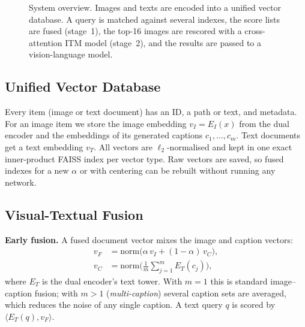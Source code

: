 \documentclass[conference]{IEEEtran}
\begin{document}
\begin{figure}[t]
\caption{System overview. Images and texts are encoded into a unified vector database. A query is matched
against several indexes, the score lists are fused (stage~1), the top-16 images are rescored with a
cross-attention ITM model (stage~2), and the results are passed to a vision-language model.}
\label{fig:arch}
\end{figure}

\subsection{Unified Vector Database}
Every item (image or text document) has an ID, a path or text, and metadata. For an image item we store
the image embedding $v_I = E_I(x)$ from the dual encoder and the embeddings of its generated captions
$c_1,\dots,c_m$. Text documents get a text embedding $v_T$. All vectors are $\ell_2$-normalised and kept
in one exact inner-product FAISS index per vector type. Raw vectors are saved, so fused indexes for a new
$\alpha$ or with centering can be rebuilt without running any network.

\subsection{Visual-Textual Fusion}
\textbf{Early fusion.} A fused document vector mixes the image and caption vectors:
\begin{equation}
\begin{aligned}
v_F &= \mathrm{norm}\big(\alpha\, v_I + (1-\alpha)\, v_C\big),\\
v_C &= \mathrm{norm}\Big(\tfrac{1}{m}\textstyle\sum_{j=1}^{m} E_T(c_j)\Big),
\end{aligned}
\label{eq:early}
\end{equation}
where $E_T$ is the dual encoder's text tower. With $m=1$ this is standard image--caption fusion; with
$m>1$ (\emph{multi-caption}) several caption sets are averaged, which reduces the noise of any single
caption. A text query $q$ is scored by $\langle E_T(q), v_F\rangle$.
\end{document}
